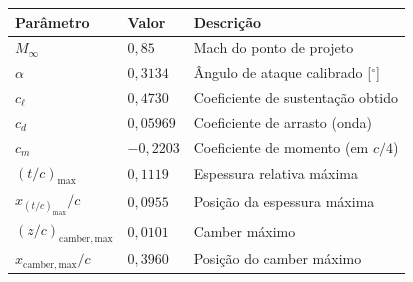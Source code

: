 \begin{tabular}{lll}
\toprule
Parâmetro & Valor & Descrição \\
\midrule
$M_{\infty}$ & $0{,}85$ & Mach do ponto de projeto \\
$\alpha$ & $0{,}3134$ & Ângulo de ataque calibrado [$^\circ$] \\
$c_\ell$ & $0{,}4730$ & Coeficiente de sustentação obtido \\
$c_d$ & $0{,}05969$ & Coeficiente de arrasto (onda) \\
$c_m$ & $-0{,}2203$ & Coeficiente de momento (em $c/4$) \\
$(t/c)_{\max}$ & $0{,}1119$ & Espessura relativa máxima \\
$x_{(t/c)_{\max}}/c$ & $0{,}0955$ & Posição da espessura máxima \\
$(z/c)_{\mathrm{camber,max}}$ & $0{,}0101$ & Camber máximo \\
$x_{\mathrm{camber,max}}/c$ & $0{,}3960$ & Posição do camber máximo \\
\bottomrule
\end{tabular}
